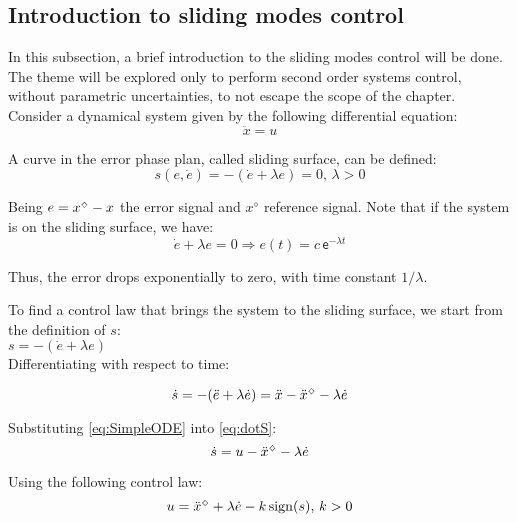 \subsection{Introduction to sliding modes control}\label{S02-3}

In this subsection, a brief introduction to the sliding modes control will be done. The theme will be explored only to perform second order systems control, without parametric uncertainties, to not escape the scope of the chapter. \\

Consider a dynamical system given by the following differential equation:
\begin{equation} \label{eq:SimpleODE}
\ddot{x} = u
\end{equation}

A curve in the error phase plan, called sliding surface, can be defined:
\begin{equation} \label{eq:SlidingSurface}
s(e, \dot{e}) = - (\dot{e} + \lambda e) = 0, \, \lambda > 0
\end{equation}

Being $e = x^{\scriptscriptstyle \diamondsuit} - x$ the error signal and $x^\diamond$ reference signal. Note that if the system is on the sliding surface, we have:
\begin{equation} \label{eq:SlidingError}
\dot{e} + \lambda e = 0 \Rightarrow e(t) = c \, \mathsf{e}^{- \lambda t}
\end{equation}

Thus, the error drops exponentially to zero, with time constant $1/\lambda$.

To find a control law that brings the system to the sliding surface, we start from the definition of $s$: \\

$ s = -(\dot{e} + \lambda e) $ \\

Differentiating with respect to time:

\begin{equation} \label{eq:dotS}
\dot{s} =  -(\ddot{e} + \lambda \dot{e}) = \ddot{x} - \ddot{x}^{\scriptscriptstyle \diamondsuit} - \lambda \dot{e} 
\end{equation}

Substituting \eqref{eq:SimpleODE} into \eqref{eq:dotS}:
\begin{equation} \label{dotS2}
\dot{s} = u - \ddot{x}^{\scriptscriptstyle \diamondsuit} - \lambda \dot{e}
\end{equation}

Using the following control law:
\begin{equation} \label{SMControlLaw1D}
u = \ddot{x}^{\scriptscriptstyle \diamondsuit} + \lambda \dot{e} - k \operatorname*{sign} (s), \, k>0
\end{equation}

